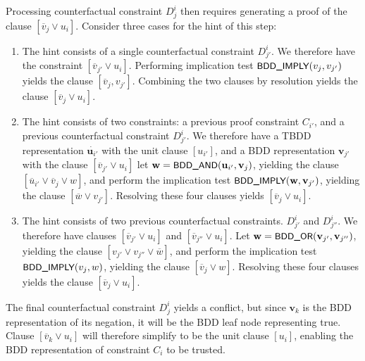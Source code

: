 \documentclass{easychair}
\renewcommand{\obar}[1]{\overline{#1}}
\newcommand{\trust}[1]{\dot {#1}}
\newcommand{\fname}[1]{\mbox{\small\sf #1}}
\newcommand{\node}[1]{\mathbf{#1}}
\newcommand{\nodeu}{\node{u}}
\newcommand{\nodev}{\node{v}}
\newcommand{\nodew}{\node{w}}
\begin{document}
Processing counterfactual constraint $D^i_j$ then requires generating a proof of the clause 
$[\obar{v}_{j} \lor u_i]$.  Consider three cases for the hint of this step:
\begin{enumerate}
\item The hint consists of a single counterfactual constraint $D^{i}_{j'}$.  We therefore have the constraint
  $[\obar{v}_{j'} \lor u_i]$.
  Performing implication test
  $\fname{BDD\_IMPLY}(v_j, v_{j'})$
  yields the clause $[\obar{v}_j, v_{j'}]$.  Combining the two clauses by resolution yields the clause
  $[\obar{v}_{j} \lor u_i]$.

\item The hint consists of two constraints:
 a previous proof constraint $C_{i'}$, and
  a previous counterfactual constraint $D^{i}_{j'}$.
  We therefore have a TBDD representation $\trust{\nodeu_{i'}}$ with the unit clause $[u_{i'}]$, and a BDD representation $\nodev_{j'}$ with the clause
$[\obar{v}_{j'} \lor u_i]$  
  let $\nodew = \fname{BDD\_AND}(\nodeu_{i'}, \nodev_j)$, yielding the clause $[\obar{u}_{i'} \lor \obar{v}_j \lor w]$, and perform the implication test
  $\fname{BDD\_IMPLY}(\nodew, \nodev_{j'})$, yielding the clause $[\obar{w} \lor v_{j'}]$.  Resolving these four clauses yields 
$[\obar{v}_{j} \lor u_i]$.

  \item The hint consists of two previous counterfactual constraints.
    $D^{i}_{j'}$ and $D^{i}_{j''}$.  We therefore have clauses
    $[\obar{v}_{j'} \lor u_i]$ and $[\obar{v}_{j''} \lor u_i]$.
    Let $\nodew = \fname{BDD\_OR}(\nodev_{j'}, \nodev_{j''})$, yielding the clause
    $[v_{j'} \lor v_{j''} \lor \obar{w}]$, and perform the implication test $\fname{BDD\_IMPLY}(v_j, w)$, yielding the clause
    $[\obar{v}_j \lor w]$.  Resolving these four clauses yields the clause
    $[\obar{v}_{j} \lor u_i]$.
\end{enumerate}  
The final counterfactual
constraint $D^{i}_j$ yields a conflict, but since $\nodev_k$ is the
BDD representation of its negation, it will be the BDD leaf node
representing true.  Clause $[\obar{v}_{k} \lor u_i]$ will therefore
simplify to be the unit clause $[u_i]$, enabling the BDD
representation of constraint $C_i$ to be trusted.

\end{document}
